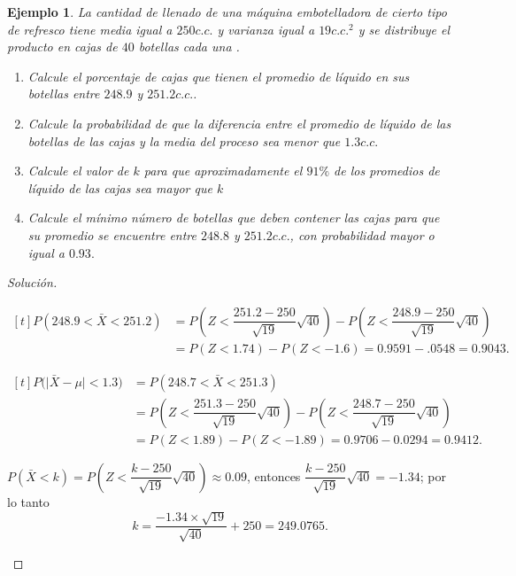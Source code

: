 \documentclass[a5paper,doc,10pt,noapacite]{apa6}
\newtheorem{ejem}{Ejemplo}
\begin{document}
{{\begin{ejem}
	La cantidad de llenado de una máquina embotelladora de cierto tipo de refresco tiene media igual a \(250 c.c.\) y varianza igual a \(19 c.c.^2\) y se distribuye el producto en cajas de \(40\) botellas cada una .
	\begin{enumerate}
		\item Calcule el porcentaje de cajas que tienen el promedio de líquido en sus botellas entre \(248.9\) y \(251.2 c.c.\).
		\item  Calcule la probabilidad de que la diferencia entre el promedio de líquido de las botellas de las cajas y la media del proceso sea menor que \(1.3 c.c.\) 
		\item Calcule el valor de \(k\) para que aproximadamente el \(91\%\) de los promedios de líquido de las cajas sea mayor que \(k\)
		\item Calcule el mínimo número de botellas que deben contener las cajas para que su promedio se encuentre entre \(248.8\) y \(251.2 c.c.\), con probabilidad mayor o igual a \(0.93.\)
	\end{enumerate}
\end{ejem}
\begin{proof}[Solución]\quad
\fontsize{7}{11}\selectfont
	\begin{APAenumerate}
		\item 
		\( \begin{aligned}[t]
		P(248.9<\bar{X}<251.2)&=P\left(Z<\dfrac{251.2-250}{\sqrt{19}}\sqrt{40}\right)-P\left(Z<\dfrac{248.9-250}{\sqrt{19}}\sqrt{40}\right)\\
		&=P(Z<1.74)-P(Z<-1.6)=0.9591-.0548=0.9043.
		\end{aligned}\)
		
		\vspace{1\baselineskip}
		\item 
		\( \begin{aligned}[t]
		P\big(\big|\bar{X}-\mu\big|<1.3\big)&=P(248.7<\bar{X}<251.3)
		\\ &=P\left(Z<\dfrac{251.3-250}{\sqrt{19}}\sqrt{40}\right)-P\left(Z<\dfrac{248.7-250}{\sqrt{19}}\sqrt{40}\right)\\
		&=P(Z<1.89)-P(Z<-1.89)=0.9706-0.0294=0.9412.
		\end{aligned}\)
		
		\vspace{1\baselineskip}
		\item \(P(\bar{X}<k)=P\left(Z<\dfrac{k-250}{\sqrt{19}}\sqrt{40}\right)\approx0.09\), entonces \(\dfrac{k-250}{\sqrt{19}}\sqrt{40}=-1.34\); por lo tanto
		\[
			k=\dfrac{-1.34 \times \sqrt{19}}{\sqrt{40}}+250=249.0765.
		\]
		

\end{APAenumerate}
\end{proof}}}
\end{document}

